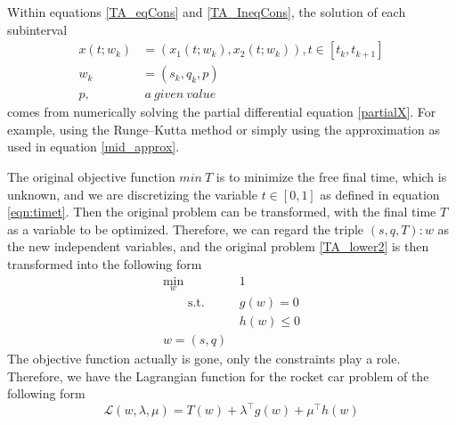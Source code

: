 \documentclass  [
  paper    = a4,
  BCOR     = 10mm,
  twoside,
  fontsize = 12pt,
  fleqn,
  toc      = bibnumbered,
  toc      = listofnumbered,
  numbers  = noendperiod,
  headings = normal,
  listof   = leveldown,
  version  = 3.03
]                                       {scrreprt}
\newcommand{\<}{\langle}
\renewcommand{\>}{\rangle}
\begin{document}
Within equations \ref{TA_eqCons} and \ref{TA_IneqCons}, the solution of each subinterval 
\begin{equation}
   \begin{aligned}
x(t; w_k) &= (x_1(t;w_k), x_2(t; w_k)),  t \in [t_{k}, t_{k+1}]\\
 w_k &= (s_k, q_k, p) \\
 p, & \   a \ given \ value
\end{aligned}
\end{equation}
comes from numerically solving the partial differential equation \ref{partialX}. For example, using the Runge–Kutta method or simply using the approximation as used in equation \ref{mid_approx}. 

The original objective function  $min \ T$ is to minimize the free final time, which is unknown, and we are discretizing the variable $t \in [0,1]$ as defined in equation \ref{eqn:timet}. Then the original problem can be transformed, with the final time $T$ as a variable to be optimized. Therefore, we can regard the triple $(s,q,T): w$ as the new independent variables, and the original problem \ref{TA_lower2} is then transformed into the following form
\begin{equation}
	\label{TA_Transform}
	\begin{aligned}
		\underset{w}{\text{min}} \qquad & 1	\\
		\qquad \text{s.t.}\qquad	&  g(w) = 0   \\
		&  h(w)	\leq 0  \\ 
		w = (s, q)
	\end{aligned}
\end{equation}
The objective function actually is gone, only the constraints play a role. Therefore, we have the Lagrangian function for the rocket car problem of the following form
\begin{equation}
	\mathcal{L}(w,\lambda, \mu) = T(w) + \lambda^\top g(w) +  \mu^\top h(w) 
	\label{eq_RC_Lag}
\end{equation}





  



 
 




\end{document}
